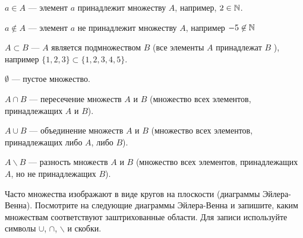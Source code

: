 \documentclass[a4paper,11pt]{article}
\begin{document}



$a\in A$ --- элемент $a$ принадлежит множеству $A$, например, $2\in \mathbb{N}$.

$a\not\in A$ --- элемент $a$ не принадлежит множеству $A$, например $-5 \not \in \mathbb{N}$

$A \subset B$ --- $A$ является подмножеством $B$ (все элементы $A$ принадлежат $B$ ), например $\{1,2,3\} \subset \{1,2,3,4,5\}.$

$\emptyset$ --- пустое множество.

$A \cap B$ --- пересечение множеств $A$ и $B$ (множество всех элементов, принадлежащих $A$ и $B$).

$A \cup B$ --- объединение множеств $A$ и $B$  (множество всех элементов, принадлежащих либо $A$, либо $B$).

$A \backslash B$ --- разность множеств $A$ и $B$ (множество всех элементов, принадлежащих $A$, но не принадлежащих $B$).

 Часто множества изображают в виде кругов на
плоскости (диаграммы Эйлера-Венна). Посмотрите на следующие
диаграммы Эйлера-Венна и запишите, каким множествам
соответствуют заштрихованные области. Для записи используйте
символы $\cup$, $\cap$, $\backslash$ и скобки.
\end{document}
